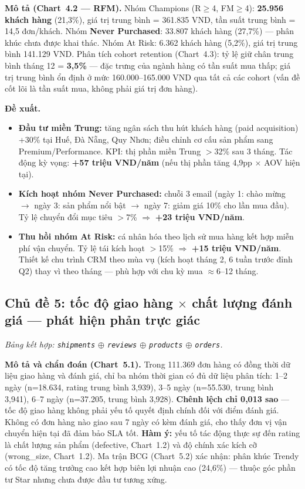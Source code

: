 \documentclass{article}
\begin{document}
\textbf{Mô tả (Chart~4.2 --- RFM).} Nhóm Champions (R$\geq$4, FM$\geq$4): \textbf{25.956 khách hàng} (21,3\%), giá trị trung bình = 361.835 VND, tần suất trung bình = 14,5 đơn/khách. Nhóm \textbf{Never Purchased}: 33.807 khách hàng (27,7\%) --- phân khúc chưa được khai thác. Nhóm At Risk: 6.362 khách hàng (5,2\%), giá trị trung bình 141.129 VND. Phân tích cohort retention (Chart~4.3): tỷ lệ giữ chân trung bình tháng 12 = \textbf{3,5\%} --- đặc trưng của ngành hàng có tần suất mua thấp; giá trị trung bình ổn định ở mức 160.000--165.000 VND qua tất cả các cohort (vấn đề cốt lõi là tần suất mua, không phải giá trị đơn hàng).

\textbf{Đề xuất.}
\begin{itemize}[noitemsep,leftmargin=1.2em]
    \item \textbf{Đầu tư miền Trung:} tăng ngân sách thu hút khách hàng (paid acquisition) +30\% tại Huế, Đà Nẵng, Quy Nhơn; điều chỉnh cơ cấu sản phẩm sang Premium/Performance. KPI: thị phần miền Trung $>$32\% sau 3 tháng. Tác động kỳ vọng: \textbf{+57 triệu VND/năm} (nếu thị phần tăng 4,9pp $\times$ AOV hiện tại).
    \item \textbf{Kích hoạt nhóm Never Purchased:} chuỗi 3 email (ngày 1: chào mừng $\rightarrow$ ngày 3: sản phẩm nổi bật $\rightarrow$ ngày 7: giảm giá 10\% cho lần mua đầu). Tỷ lệ chuyển đổi mục tiêu $>$7\% $\Rightarrow$ \textbf{+23 triệu VND/năm}.
    \item \textbf{Thu hồi nhóm At Risk:} cá nhân hóa theo lịch sử mua hàng kết hợp miễn phí vận chuyển. Tỷ lệ tái kích hoạt $>$15\% $\Rightarrow$ \textbf{+15 triệu VND/năm}. Thiết kế chu trình CRM theo mùa vụ (kích hoạt tháng 2, 6 tuần trước đỉnh Q2) thay vì theo tháng --- phù hợp với chu kỳ mua $\approx$6--12 tháng.
\end{itemize}

\subsection{Chủ đề 5: tốc độ giao hàng $\times$ chất lượng đánh giá --- phát hiện phản trực giác}
\label{sec:theme5}
\textit{Bảng kết hợp: \texttt{shipments} $\oplus$ \texttt{reviews} $\oplus$ \texttt{products} $\oplus$ \texttt{orders}.}

\textbf{Mô tả và chẩn đoán (Chart~5.1).} Trong 111.369 đơn hàng có đồng thời dữ liệu giao hàng và đánh giá, chỉ ba nhóm thời gian có đủ dữ liệu phân tích: 1--2 ngày (n=18.634, rating trung bình 3,939), 3--5 ngày (n=55.530, trung bình 3,941), 6--7 ngày (n=37.205, trung bình 3,928). \textbf{Chênh lệch chỉ 0,013 sao} --- tốc độ giao hàng không phải yếu tố quyết định chính đối với điểm đánh giá. Không có đơn hàng nào giao sau 7 ngày có kèm đánh giá, cho thấy đơn vị vận chuyển hiện tại đã đảm bảo SLA tốt. \textbf{Hàm ý:} yếu tố tác động thực sự đến rating là chất lượng sản phẩm (defective, Chart~1.2) và độ chính xác kích cỡ (wrong\_size, Chart~1.2). Ma trận BCG (Chart~5.2) xác nhận: phân khúc Trendy có tốc độ tăng trưởng cao kết hợp biên lợi nhuận cao (24,6\%) --- thuộc góc phần tư Star nhưng chưa được đầu tư tương xứng.
\end{document}
